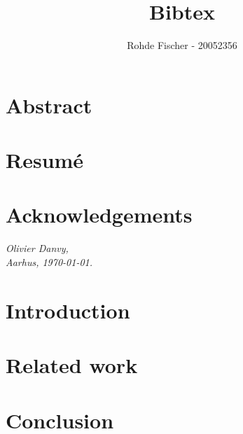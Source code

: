 \documentclass[twoside,11pt,openright,a4paper]{report}
\begin{document}
\author{Rohde Fischer - 20052356}
\title{Bibtex}
\pagestyle{empty}
\maketitle


\pagestyle{plain}
\setcounter{page}{1}

\chapter*{Abstract}


\chapter*{Resum\'e}


\chapter*{Acknowledgements}

\todo{\dots}

\vspace{2ex}
\begin{flushright}
  \emph{Olivier Danvy,}\\
  \emph{Aarhus, \today.}
\end{flushright}

\tableofcontents
{}
\setcounter{secnumdepth}{2}


\chapter{Introduction}
\label{ch:intro}




\chapter{Related work}
\label{ch:related}




\chapter{Conclusion}
\label{ch:conclusion}

\todo{\dots}


\printbibliography
\end{document}
